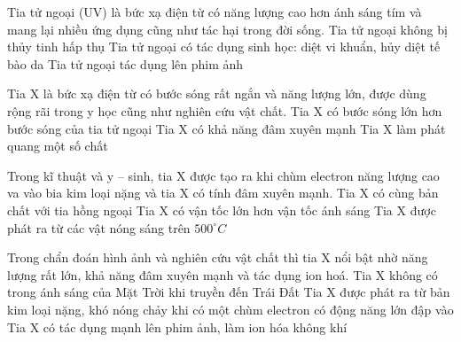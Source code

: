 \setcounter{paragraph}{0}
\setcounter{ex}{0} 
\PhanII
\begin{ex}
Tia tử ngoại (UV) là bức xạ điện từ có năng lượng cao hơn ánh sáng tím và mang lại nhiều ứng dụng cũng như tác hại trong đời sống.
{Tia tử ngoại không bị thủy tinh hấp thụ}
{\True Tia tử ngoại có tác dụng sinh học: diệt vi khuẩn, hủy diệt tế bào da}
{\True Tia tử ngoại tác dụng lên phim ảnh}
\loigiai{
\begin{itemchoice}
\itemch
\itemch
\itemch
\itemch
\end{itemchoice}
}
\end{ex} 
\begin{ex}
Tia X là bức xạ điện từ có bước sóng rất ngắn và năng lượng lớn, được dùng rộng rãi trong y học cũng như nghiên cứu vật chất.
{Tia X có bước sóng lớn hơn bước sóng của tia tử ngoại}
{\True Tia X có khả năng đâm xuyên mạnh}
{\True Tia X làm phát quang một số chất}
\loigiai{
\begin{itemchoice}
\itemch
\itemch
\itemch
\itemch
\end{itemchoice}
}
\end{ex} 
\begin{ex}
Trong kĩ thuật và y – sinh, tia X được tạo ra khi chùm electron năng lượng cao va vào bia kim loại nặng và tia X có tính đâm xuyên mạnh.
{\True Tia X có cùng bản chất với tia hồng ngoại}
{Tia X có vận tốc lớn hơn vận tốc ánh sáng}
{Tia X được phát ra từ các vật nóng sáng trên $500^\circ C$}
\loigiai{
\begin{itemchoice}
\itemch
\itemch
\itemch
\itemch
\end{itemchoice}
}
\end{ex} 
\begin{ex}
Trong chẩn đoán hình ảnh và nghiên cứu vật chất thì tia X nổi bật nhờ năng lượng rất lớn, khả năng đâm xuyên mạnh và tác dụng ion hoá.
{Tia X không có trong ánh sáng của Mặt Trời khi truyền đến Trái Đất}
{\True Tia X được phát ra từ bản kim loại nặng, khó nóng chảy khi có một chùm electron có động năng lớn đập vào}
{\True Tia X có tác dụng mạnh lên phim ảnh, làm ion hóa không khí}
\loigiai{
\begin{itemchoice}
\itemch
\itemch
\itemch
\itemch
\end{itemchoice}
}
\end{ex} 

